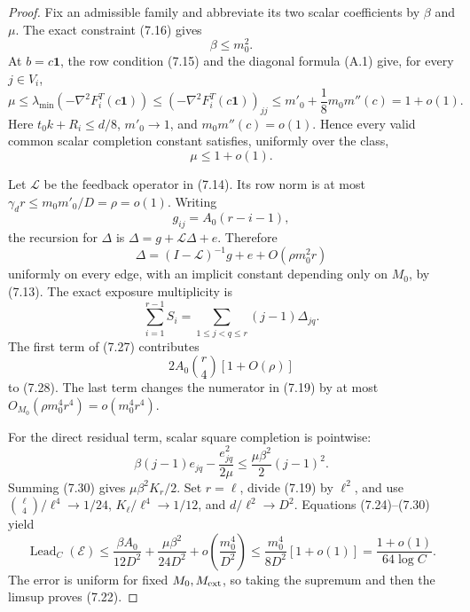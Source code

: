 \begin{proof}
Fix an admissible family and abbreviate its two scalar coefficients by
\(\beta\) and \(\mu\).  The exact constraint (7.16) gives
\[
 \beta\le m_0^2.
\tag{7.24}
\]
At \(b=c\mathbf1\), the row condition (7.15) and the diagonal formula (A.1)
give, for every \(j\in V_i\),
\[
 \mu\le\lambda_{\min}(-\nabla^2F_i^T(c\mathbf1))
 \le(-\nabla^2F_i^T(c\mathbf1))_{jj}
 \le m'_0+\frac18m_0m''(c)=1+o(1).
\tag{7.25}
\]
Here \(t_0k+R_i\le d/8\), \(m'_0\to1\), and
\(m_0m''(c)=o(1)\).  Hence every valid common scalar completion constant
satisfies, uniformly over the class,
\[
 \mu\le1+o(1).
\tag{7.26}
\]

Let \(\mathcal L\) be the feedback operator in (7.14).  Its row norm is at
most \(\gamma_dr\le m_0m'_0/D=\rho=o(1)\).  Writing
\[
 g_{ij}=A_0(r-i-1),
\]
the recursion for \(\Delta\) is
\(\Delta=g+\mathcal L\Delta+e\).  Therefore
\[
 \Delta=(I-\mathcal L)^{-1}g+e+O(\rho m_0^2r)
\tag{7.27}
\]
uniformly on every edge, with an implicit constant depending only on \(M_0\),
by (7.13).  The exact exposure multiplicity is
\[
 \sum_{i=1}^{r-1}S_i
 =\sum_{1\le j<q\le r}(j-1)\Delta_{jq}.
\tag{7.28}
\]
The first term of (7.27) contributes
\[
 2A_0\binom r4[1+O(\rho)]
\tag{7.29}
\]
to (7.28).  The last term changes the numerator in (7.19) by at most
\(O_{M_0}(\rho m_0^4r^4)=o(m_0^4r^4)\).

For the direct residual term, scalar square completion is pointwise:
\[
 \beta(j-1)e_{jq}-\frac{e_{jq}^2}{2\mu}
 \le\frac{\mu\beta^2}{2}(j-1)^2.
\tag{7.30}
\]
Summing (7.30) gives \(\mu\beta^2K_r/2\).  Set \(r=\ell\), divide (7.19)
by \(\ell^2\), and use
\(\binom\ell4/\ell^4\to1/24\), \(K_\ell/\ell^4\to1/12\), and
\(d/\ell^2\to D^2\).  Equations (7.24)--(7.30) yield
\[
 \operatorname{Lead}_C(\mathcal E)
 \le\frac{\beta A_0}{12D^2}
   +\frac{\mu\beta^2}{24D^2}
   +o\!\left(\frac{m_0^4}{D^2}\right)
 \le\frac{m_0^4}{8D^2}[1+o(1)]
 =\frac{1+o(1)}{64\log C}.
\tag{7.31}
\]
The error is uniform for fixed \(M_0,M_{\rm ext}\), so taking the supremum
and then the limsup proves (7.22).


\end{proof}
